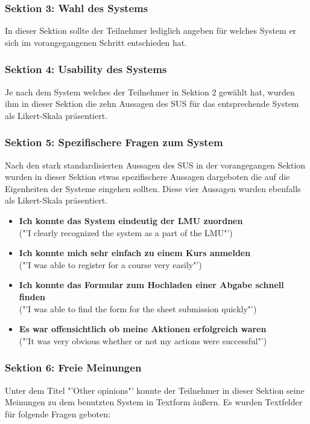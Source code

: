 \documentclass[11pt,a4paper,twoside,ngerman]{article}
\begin{document}
\subsubsection{Sektion 3: Wahl des Systems}
In dieser Sektion sollte der Teilnehmer lediglich angeben für welches System er sich im vorangegangenen Schritt entschieden hat.

\subsubsection{Sektion 4: Usability des Systems}
Je nach dem System welches der Teilnehmer in Sektion 2 gewählt hat, wurden ihm in dieser Sektion die zehn Aussagen des SUS für das entsprechende System als Likert-Skala präsentiert.

\subsubsection{Sektion 5: Spezifischere Fragen zum System}
Nach den stark standardisierten Aussagen des SUS in der vorangegangen Sektion wurden in dieser Sektion etwas spezifischere Aussagen dargeboten die auf die Eigenheiten der Systeme eingehen sollten. Diese vier Aussagen wurden ebenfalls als Likert-Skala präsentiert.

\begin{itemize}
    \item \textbf{Ich konnte das System eindeutig der LMU zuordnen} \\ ("'I clearly recognized the system as a part of the LMU"')
    \item \textbf{Ich konnte mich sehr einfach zu einem Kurs anmelden} \\ ("'I was able to register for a course very easily"')
    \item \textbf{Ich konnte das Formular zum Hochladen einer Abgabe schnell finden} \\ ("'I was able to find the form for the sheet submission quickly"')
    \item \textbf{Es war offensichtlich ob meine Aktionen erfolgreich waren} \\ ("'It was very obvious whether or not my actions were successful"')
\end{itemize}

\subsubsection{Sektion 6: Freie Meinungen}
Unter dem Titel "'Other opinions"' konnte der Teilnehmer in dieser Sektion seine Meinungen zu dem benutzten System in Textform äußern. Es wurden Textfelder für folgende Fragen geboten:
\end{document}
